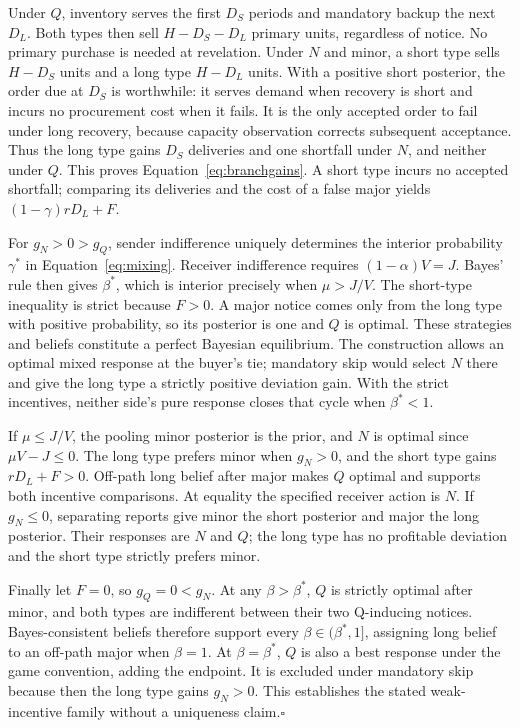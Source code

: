 \documentclass[preprint,11pt,authoryear]{elsarticle}
\begin{document}
Under $Q$, inventory serves the first $D_S$ periods and mandatory backup the next $D_L$. Both types then sell $H-D_S-D_L$ primary units, regardless of notice. No primary purchase is needed at revelation. Under $N$ and minor, a short type sells $H-D_S$ units and a long type $H-D_L$ units. With a positive short posterior, the order due at $D_S$ is worthwhile: it serves demand when recovery is short and incurs no procurement cost when it fails. It is the only accepted order to fail under long recovery, because capacity observation corrects subsequent acceptance. Thus the long type gains $D_S$ deliveries and one shortfall under $N$, and neither under $Q$. This proves Equation~\eqref{eq:branchgains}. A short type incurs no accepted shortfall; comparing its deliveries and the cost of a false major yields $(1-\gamma)rD_L+F$.

For $g_N>0>g_Q$, sender indifference uniquely determines the interior probability $\gamma^*$ in Equation~\eqref{eq:mixing}. Receiver indifference requires $(1-\alpha)V=J$. Bayes' rule then gives $\beta^*$, which is interior precisely when $\mu>J/V$. The short-type inequality is strict because $F>0$. A major notice comes only from the long type with positive probability, so its posterior is one and $Q$ is optimal. These strategies and beliefs constitute a perfect Bayesian equilibrium. The construction allows an optimal mixed response at the buyer's tie; mandatory skip would select $N$ there and give the long type a strictly positive deviation gain. With the strict incentives, neither side's pure response closes that cycle when $\beta^*<1$.

If $\mu\le J/V$, the pooling minor posterior is the prior, and $N$ is optimal since $\mu V-J\le0$. The long type prefers minor when $g_N>0$, and the short type gains $rD_L+F>0$. Off-path long belief after major makes $Q$ optimal and supports both incentive comparisons. At equality the specified receiver action is $N$. If $g_N\le0$, separating reports give minor the short posterior and major the long posterior. Their responses are $N$ and $Q$; the long type has no profitable deviation and the short type strictly prefers minor.

Finally let $F=0$, so $g_Q=0<g_N$. At any $\beta>\beta^*$, $Q$ is strictly optimal after minor, and both types are indifferent between their two Q-inducing notices. Bayes-consistent beliefs therefore support every $\beta\in(\beta^*,1]$, assigning long belief to an off-path major when $\beta=1$. At $\beta=\beta^*$, $Q$ is also a best response under the game convention, adding the endpoint. It is excluded under mandatory skip because then the long type gains $g_N>0$. This establishes the stated weak-incentive family without a uniqueness claim.\hfill$\square$
\end{document}

